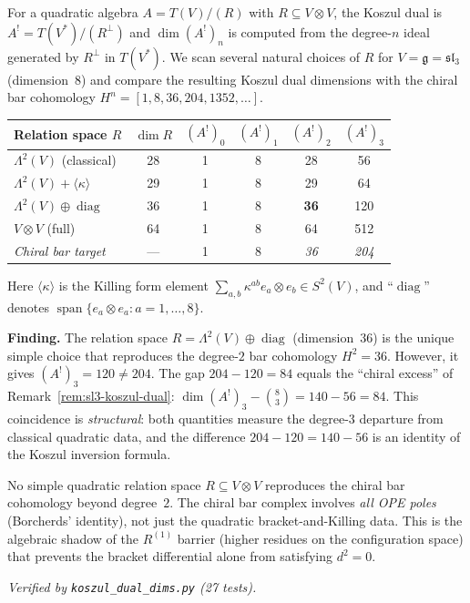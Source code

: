 \begin{computation}
\label{comp:sl3-koszul-dual-scan}

For a quadratic algebra $A = T(V)/(R)$ with $R \subseteq V \otimes V$,
the Koszul dual is $A^! = T(V^*) / (R^\perp)$ and $\dim(A^!)_n$
is computed from the degree-$n$ ideal generated by $R^\perp$ in
$T(V^*)$.  We scan several natural choices of $R$ for
$V = \mathfrak{g} = \mathfrak{sl}_3$ (dimension~$8$) and compare
the resulting Koszul dual dimensions with the chiral bar cohomology
$H^n = [1, 8, 36, 204, 1352, \ldots]$.

\medskip
\noindent
\begin{center}
\begin{tabular}{l|c|cccc}
Relation space $R$ & $\dim R$ & $(A^!)_0$ & $(A^!)_1$ & $(A^!)_2$ & $(A^!)_3$ \\
\hline
$\Lambda^2(V)$ (classical) & 28 & 1 & 8 & 28 & 56 \\
$\Lambda^2(V) + \langle \kappa \rangle$ & 29 & 1 & 8 & 29 & 64 \\
$\Lambda^2(V) \oplus \operatorname{diag}$ & 36 & 1 & 8 & \textbf{36} & 120 \\
$V \otimes V$ (full) & 64 & 1 & 8 & 64 & 512 \\
\hline
\textit{Chiral bar target} & --- & 1 & 8 & \textit{36} & \textit{204}
\end{tabular}
\end{center}

Here $\langle \kappa \rangle$ is the Killing form element
$\sum_{a,b} \kappa^{ab} e_a \otimes e_b \in S^2(V)$, and
``$\operatorname{diag}$'' denotes $\operatorname{span}\{e_a \otimes e_a
: a = 1, \ldots, 8\}$.

\medskip
\noindent\textbf{Finding.}
The relation space $R = \Lambda^2(V) \oplus \operatorname{diag}$ (dimension~$36$)
is the unique simple choice that reproduces the degree-$2$ bar
cohomology $H^2 = 36$.  However, it gives $(A^!)_3 = 120 \neq 204$.
The gap $204 - 120 = 84$ equals the ``chiral excess'' of
Remark~\ref{rem:sl3-koszul-dual}: $\dim(A^!)_3 - \binom{8}{3} = 140 - 56 = 84$.
This coincidence is \emph{structural}: both quantities measure the
degree-$3$ departure from classical quadratic data, and the difference
$204 - 120 = 140 - 56$ is an identity of the Koszul inversion formula.

No simple quadratic relation space $R \subseteq V \otimes V$ reproduces
the chiral bar cohomology beyond degree~$2$.  The chiral bar complex
involves \emph{all OPE poles} (Borcherds' identity), not just the
quadratic bracket-and-Killing data.  This is the algebraic shadow
of the $R^{(1)}$ barrier (higher residues on the configuration space)
that prevents the bracket differential alone from satisfying $d^2 = 0$.

\emph{Verified by \texttt{koszul\_dual\_dims.py} {\normalfont(27 tests)}.}
\end{computation}

